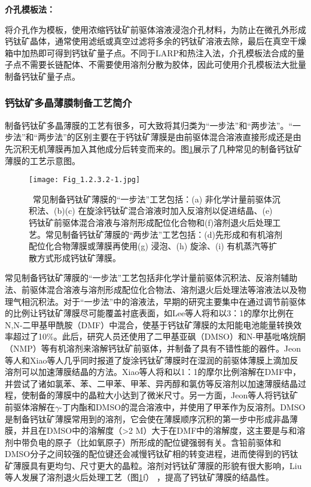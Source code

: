 \documentclass[forlib]{WHUMaster}   %
\begin{document}
{\textbf{介孔模板法：}

将介孔作为模板，使用浓缩钙钛矿前驱体溶液浸泡介孔材料，为防止在微孔外形成钙钛矿晶体，通常使用滤纸或真空过滤将多余的钙钛矿溶液去除，最后在真空干燥箱中加热即可得到钙钛矿量子点\cite{RN80}。\iffalse 再将具有孔径为2.5-7 nm的六边形有序排列的一维通道或者孔径为15-50 nm的无序多空网络结构是制作量子点材料的良好模板。\fi 不同于LARP和热注入法，介孔模板法合成的量子点不需要长链配体、不需要使用溶剂分散为胶体，因此可使用介孔模板法大批量制备钙钛矿量子点。

\subsubsection{钙钛矿多晶薄膜制备工艺简介}%

制备钙钛矿多晶薄膜的工艺有很多，可大致将其归类为“一步法”和“两步法”。“一步法”和“两步法”的区别主要在于钙钛矿薄膜是由前驱体混合溶液直接形成还是由先沉积无机薄膜再加入其他成分后转变而来的\cite{RN96,RN97,RN98}。图\ref{fig:1.2.3.2}展示了几种常见的制备钙钛矿薄膜的工艺示意图。

\begin{figure}[ht]
\centering
  \texttt{[image: Fig\_1.2.3.2-1.jpg]}
  \caption{\rm \ 常见制备钙钛矿薄膜的“一步法”工艺包括：(a) 非化学计量前驱体沉积法、(b)(c) 在旋涂钙钛矿混合溶液时加入反溶剂以促进结晶、(e) 钙钛矿前驱体混合溶液与溶剂形成配位化合物和(f)溶剂退火后处理工艺。常见制备钙钛矿薄膜的“两步法”工艺包括：(d)先形成和有机溶剂配位化合物薄膜或薄膜再使用(g) 浸泡、(h) 旋涂、(i) 有机蒸汽等扩散方式形成钙钛矿薄膜\cite{RN95}。}
  \label{fig:1.2.3.2}
\end{figure}

常见制备钙钛矿薄膜的“一步法”工艺包括非化学计量前驱体沉积法、反溶剂辅助法、前驱体混合溶液与溶剂形成配位化合物法、溶剂退火后处理法等溶液法以及物理气相沉积法\cite{RN95}。对于“一步法”中的溶液法，早期的研究主要集中在通过调节前驱体的比例让钙钛矿薄膜尽可能覆盖衬底表面，如Lee等人将和以3：1的摩尔比例在N,N-二甲基甲酰胺（DMF）中混合，使基于钙钛矿薄膜的太阳能电池能量转换效率超过了10\%\cite{RN96}。此后，研究人员还使用了二甲基亚砜（DMSO）和N-甲基吡咯烷酮（NMP）等有机溶剂来溶解钙钛矿前驱体，并制备了具有不错性能的器件\cite{RN103}。Jeon等人和Xiao等人几乎同时报道了旋涂钙钛矿薄膜时在湿润的前驱体薄膜上滴加反溶剂可以加速薄膜结晶的方法\cite{RN100,RN104}。Xiao等人将和以1：1的摩尔比例溶解在DMF中，并尝试了诸如氯苯、苯、二甲苯、甲苯、异丙醇和氯仿等反溶剂以加速薄膜结晶过程，使制备的薄膜中的晶粒大小达到了微米尺寸\cite{RN100}。另一方面，Jeon等人将钙钛矿前驱体溶解在$\gamma$-丁内酯和DMSO的混合溶液中，并使用了甲苯作为反溶剂\cite{RN104}。DMSO是制备钙钛矿薄膜常用到的溶剂，它会使在薄膜顺序沉积的第一步中形成非晶薄膜，并且在DMSO中的溶解度（>2 M）大于在DMF中的溶解度，这主要是与和溶剂中带负电的原子（比如氧原子）所形成的配位键强弱有关\cite{RN105}。含铅前驱体和DMSO分子之间较强的配位键还会减慢钙钛矿相的转变进程，进而使得到的钙钛矿薄膜具有更均匀、尺寸更大的晶粒\cite{RN105,RN106,RN109,RN110}。溶剂对钙钛矿薄膜的形貌有很大影响，Liu等人发展了溶剂退火后处理工艺（图\ref{fig:1.2.3.2}f） ，提高了钙钛矿薄膜的结晶性\cite{RN106}。

}
\end{document}
